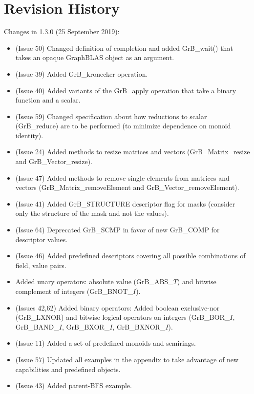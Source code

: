 \chapter{Revision History}
\label{Chp:RevHistory}

Changes in 1.3.0 (25 September 2019):
\begin{itemize}
\item (Issue 50) Changed definition of completion and added {\sf GrB\_wait()} that takes an opaque GraphBLAS object as an argument.
\item (Issue 39) Added {\sf GrB\_kronecker} operation.
\item (Issue 40) Added variants of the {\sf GrB\_apply} operation that take a binary function and a scalar.
\item (Issue 59) Changed specification about how reductions to scalar ({\sf GrB\_reduce}) are to be performed (to minimize dependence on monoid identity).
\item (Issue 24) Added methods to resize matrices and vectors ({\sf GrB\_Matrix\_resize} and {\sf GrB\_Vector\_resize}).
\item (Issue 47) Added methods to remove single elements from matrices and vectors ({\sf GrB\_Matrix\_removeElement} and {\sf GrB\_Vector\_removeElement}).
\item (Issue 41) Added {\sf GrB\_STRUCTURE} descriptor flag for masks (consider only the structure of the mask and not the values).
\item (Issue 64) Deprecated {\sf GrB\_SCMP} in favor of new {\sf GrB\_COMP} for descriptor values.
\item (Issue 46) Added predefined descriptors covering all possible combinations of field, value pairs.
\item Added unary operators: absolute value ({\sf GrB\_ABS\_$T$}) and bitwise complement of integers ({\sf GrB\_BNOT\_$I$}). 
\item (Issues 42,62) Added binary operators: Added boolean exclusive-nor ({\sf GrB\_LXNOR}) and bitwise logical operators on integers ({\sf GrB\_BOR\_$I$}, {\sf GrB\_BAND\_$I$}, {\sf GrB\_BXOR\_$I$}, {\sf GrB\_BXNOR\_$I$}).
\item (Issue 11) Added a set of predefined monoids and semirings.
\item (Issue 57) Updated all examples in the appendix to take advantage of new capabilities and predefined objects.
\item (Issue 43) Added parent-BFS example.

\end{itemize}
